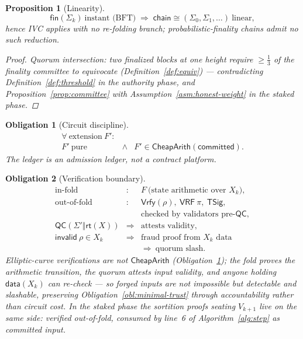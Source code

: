 \documentclass[11pt,letterpaper]{article}
\newtheorem{proposition}{Proposition}
\newtheorem{obligation}{Obligation}
\begin{document}
\begin{proposition}[Linearity]\label{prop:linear}
\[
\mathsf{fin}(\Sigma_k)\ \text{instant (BFT)}
\;\Rightarrow\;
\mathsf{chain}\cong(\Sigma_0,\Sigma_1,\dots)\ \text{linear},
\]
hence IVC applies with no re-folding branch; probabilistic-finality chains
admit no such reduction.
\begin{proof}
Quorum intersection: two finalized blocks at one height require
$\geq\tfrac13$ of the finality committee to equivocate
(Definition~\ref{def:equiv}) --- contradicting
Definition~\ref{def:threshold} in the authority phase, and
Proposition~\ref{prop:committee} with
Assumption~\ref{asm:honest-weight} in the staked phase.
\end{proof}
\end{proposition}

\begin{obligation}[Circuit discipline]\label{obl:circuit}
\[
\begin{array}{rcl}
\forall\ \text{extension}\ F':&&\\
F'\ \text{pure}&\land&
F'\in\mathsf{CheapArith}(\mathsf{committed}).
\end{array}
\]
The ledger is an admission ledger, not a contract platform.
\end{obligation}

\begin{obligation}[Verification boundary]\label{obl:boundary}
\[
\begin{array}{rcl}
\text{in-fold}&:&F\ \text{(state arithmetic over $X_k$)},\\
\text{out-of-fold}&:&\mathsf{Vrfy}(\rho),\ \mathsf{VRF}\ \pi,\
  \mathsf{TSig},\\
&&\text{checked by validators pre-}\mathsf{QC},\\
\mathsf{QC}(\Sigma'\Vert\mathsf{rt}(X))&\Rightarrow&
  \text{attests validity},\\
\mathsf{invalid}\ \rho\in X_k&\Rightarrow&
  \text{fraud proof from $X_k$ data}\\
&&\Rightarrow\ \text{quorum slash}.
\end{array}
\]
Elliptic-curve verifications are not $\mathsf{CheapArith}$
(Obligation~\ref{obl:circuit}); the fold proves the arithmetic
transition, the quorum attests input validity, and anyone holding
$\mathsf{data}(X_k)$ can re-check --- so forged inputs are not
impossible but detectable and slashable, preserving
Obligation~\ref{obl:minimal-trust} through accountability rather than
circuit cost.  In the staked phase the sortition proofs seating
$V_{k+1}$ live on the same side: verified out-of-fold, consumed by
line~6 of Algorithm~\ref{alg:step} as committed input.
\end{obligation}
\end{document}
